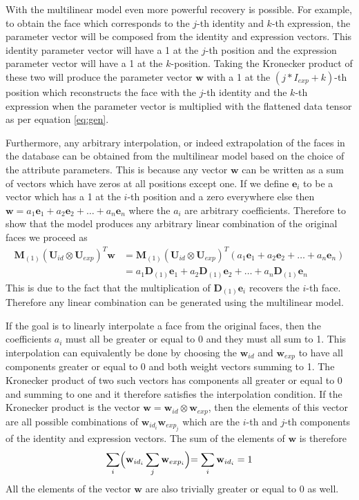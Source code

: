 \documentclass[11pt,a4paper,twoside]{report}
\begin{document}
With the multilinear model even more powerful recovery is possible. For
example, to obtain the face which corresponds to the $j$-th identity
and $k$-th expression, the parameter vector will be composed from the identity and
expression vectors. This identity parameter vector will have a 1 at the $j$-th
position and the expression parameter vector will have a 1 at the
$k$-position. Taking the Kronecker product of these two will produce the
parameter vector $\mathbf{w}$ with a 1 at the $(j*I_{exp} + k)$-th position which
reconstructs the face with the $j$-th identity and the $k$-th expression when
the parameter vector is multiplied with the flattened data tensor as per
equation \ref{eq:gen}.

Furthermore, any arbitrary interpolation, or indeed extrapolation of the faces in
the database can be obtained from the multilinear model based on the choice of
the attribute parameters. This is because any vector $\mathbf{w}$ can
be written as a sum of vectors which have zeros at all positions except
one. If we define $\mathbf{e}_i$ to be a vector which has a 1 at the $i$-th position and
a zero everywhere else then $\mathbf{w} = a_1\mathbf{e}_1 + a_2\mathbf{e}_2 +
\ldots + a_n\mathbf{e}_n$ where the $a_i$ are arbitrary coefficients. Therefore to show that the model produces any
arbitrary linear combination of the original faces we proceed as
\begin{align} 
\mathbf{M}_{(1)}(\mathbf{U}_{id} \otimes \mathbf{U}_{exp})^T\mathbf{w} &=
\mathbf{M}_{(1)}(\mathbf{U}_{id} \otimes \mathbf{U}_{exp})^T(a_1\mathbf{e}_1 +
a_2\mathbf{e}_2 + \ldots + a_n\mathbf{e}_n)\\
&=a_1\mathbf{D}_{(1)}\mathbf{e}_1 +
a_2\mathbf{D}_{(1)}\mathbf{e}_2 + \ldots + a_n\mathbf{D}_{(1)}\mathbf{e}_n
\end{align}
This is due to the fact that the multiplication of $\mathbf{D}_{(1)}\mathbf{e}_i$ recovers the
$i$-th face. Therefore any linear combination can be generated using the
multilinear model. 

If the goal is to linearly interpolate a face from the original faces, then the
coefficients $a_i$ must all be greater or equal to 0 and they must all sum to
1. This interpolation can equivalently be done by choosing the $\mathbf{w}_{id}$
and $\mathbf{w}_{exp}$ to have all components greater or equal to 0 and both
weight vectors summing to 1. The Kronecker product of two such vectors has
components all greater or equal to 0 and summing to one and it therefore
satisfies the interpolation condition. If the Kronecker product
is the vector $\mathbf{w} = \mathbf{w}_{id} \otimes \mathbf{w}_{exp}$, then the
elements of this vector are all possible combinations of
$\mathbf{w}_{id_i}\mathbf{w}_{exp_j}$ which are the $i$-th and $j$-th components
of the identity and expression vectors. The sum of the elements of $\mathbf{w}$ is therefore
\begin{equation*}
\sum_i \Bigr(\mathbf{w}_{id_i} \sum_j \mathbf{w}_{exp_i} \Bigl) = \sum_i
\mathbf{w}_{id_i} = 1
\end{equation*}
All the elements of the vector $\mathbf{w}$ are also trivially greater or equal to 0
as well.
\end{document}
